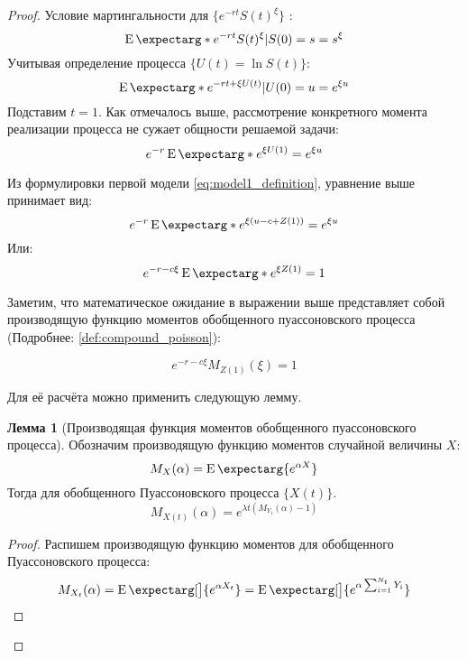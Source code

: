 \documentclass[a4paper,12pt]{article}
\theoremstyle{definition}
\newtheorem{lemma}{Лемма}
\newcommand{\expect}{\operatorname{E}\expectarg}
\begin{document}
\begin{proof}
Условие мартингальности для $\{e^{-rt} S(t)^{\xi}\}$ :
\begin{equation*}
\expect*{e^{-rt} S(t)^{\xi}|S(0) = s} = s^{\xi}
\end{equation*}
Учитывая определение процесса $\{U(t) = \ln{S(t)}\}$:
\begin{equation*}
\expect*{e^{-rt + \xi U(t)}|U(0) = u} = e^{\xi u}
\end{equation*}
Подставим $t = 1$. Как отмечалось выше, рассмотрение конкретного момента реализации процесса не сужает общности решаемой задачи:
\begin{equation*}\label{eq:thm2_eq1}
e^{-r}\expect*{e^{\xi U(1)}} = e^{\xi u}
\end{equation*}

Из формулировки первой модели \eqref{eq:model1_definition}, уравнение выше принимает вид:
\begin{equation*}
e^{-r}\expect*{e^{\xi(u - c + Z(1))}} = e^{\xi u}
\end{equation*}
Или:
\begin{equation*}
e^{-r - c \xi} \expect*{e^{\xi Z(1)}} = 1
\end{equation*}

Заметим, что математическое ожидание в выражении выше представляет собой производящую функцию моментов обобщенного пуассоновского процесса (Подробнее: \ref{def:compound_poisson}):

\begin{equation}\label{eq:thm2_eq2}
e^{-r - c \xi} M_{Z(1)}(\xi) = 1
\end{equation}

Для её расчёта можно применить следующую лемму.

\begin{lemma}[Производящая функция моментов обобщенного пуассоновского процесса]\label{thm:thm2_moment_generating_function}
Обозначим производящую функцию моментов случайной величины $X$:
\begin{equation*}
    M_X(\alpha) = \expect{e^{\alpha X}}
\end{equation*}
Тогда для обобщенного Пуассоновского процесса $\{X(t)\}$.
\begin{equation}\label{eq:moment_generating_for_poisson}
     M_{X(t)}(\alpha) = e^{\lambda t \left(M_{Y_1}(\alpha) - 1\right)}
\end{equation}
\end{lemma}
\begin{proof}
Распишем производящую функцию моментов для обобщенного Пуассоновского процесса:
\begin{equation*}
     M_{X_t}(\alpha) = \expect[\big]{e^{\alpha X_t}} = \expect[\big]{e^{\alpha \sum_{i=1}^{N_t} Y_i}}
\end{equation*}


\end{proof}
\end{proof}
\end{document}

